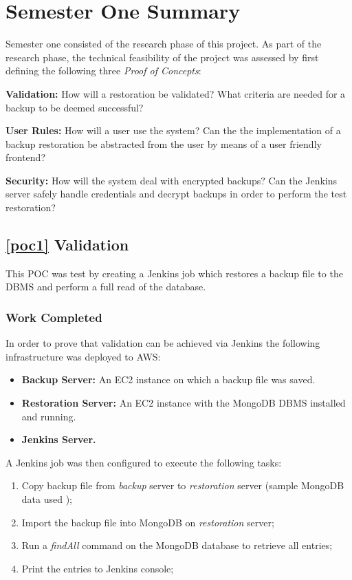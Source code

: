 \section{Semester One Summary}
Semester one consisted of the research phase of this project. As part of the research phase, the technical feasibility of the project was assessed by first defining the following three \textit{Proof of Concepts}:


\begin{POC}
	\item \label{poc1} \textbf{Validation:} How will a restoration be validated? What criteria are needed for a backup to be deemed successful?
	\item \label{poc2} \textbf{User Rules:} How will a user use the system? Can the the implementation of a backup restoration be abstracted from the user by means of a user friendly frontend?
	\item \label{poc3} \textbf{Security:} How will the system deal with encrypted backups? Can the Jenkins server safely handle credentials and decrypt backups in order to perform the test restoration?
\end{POC}

\subsection{\ref{poc1} Validation}
  This POC was test by creating a Jenkins job which restores a backup file to the DBMS and perform a full read of the database.

	\subsubsection{Work Completed}
	In order to prove that validation can be achieved via Jenkins the following infrastructure was deployed to AWS:
	\begin{itemize}
		\item \textbf{Backup Server:} An EC2 instance on which a backup file was saved.
		\item \textbf{Restoration Server:} An EC2 instance with the MongoDB DBMS installed and running.
		\item \textbf{Jenkins Server.}
	\end{itemize}
	A Jenkins job was then configured to execute the following tasks:
	\begin{enumerate}
		\item Copy backup file from \textit{backup} server to \textit{restoration} server (sample MongoDB data used \citep{mongo});
		\item Import the backup file into MongoDB on \textit{restoration} server;
		\item Run a \textit{findAll} command on the MongoDB database to retrieve all entries;
		\item Print the entries to Jenkins console;
	\end{enumerate}

